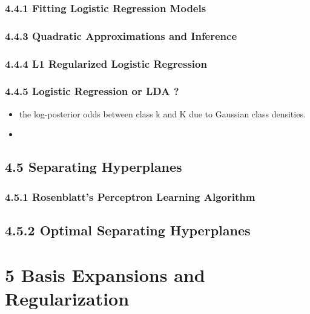 \documentclass[11pt]{article}
\begin{document}
\subsubsection{4.4.1 Fitting Logistic Regression
Models}\label{fitting-logistic-regression-models}

\subsubsection{4.4.3 Quadratic Approximations and
Inference}\label{quadratic-approximations-and-inference}

\subsubsection{4.4.4 L1 Regularized Logistic
Regression}\label{l1-regularized-logistic-regression}

\subsubsection{4.4.5 Logistic Regression or LDA
?}\label{logistic-regression-or-lda}

\begin{itemize}
\item
  the log-posterior odds between class k and K due to Gaussian class
  densities.
\item
\end{itemize}

\subsection{4.5 Separating Hyperplanes}\label{separating-hyperplanes}

\subsubsection{4.5.1 Rosenblatt's Perceptron Learning
Algorithm}\label{rosenblatts-perceptron-learning-algorithm}

\subsection{4.5.2 Optimal Separating
Hyperplanes}\label{optimal-separating-hyperplanes}

    \section{5 Basis Expansions and
Regularization}\label{basis-expansions-and-regularization}
\end{document}
